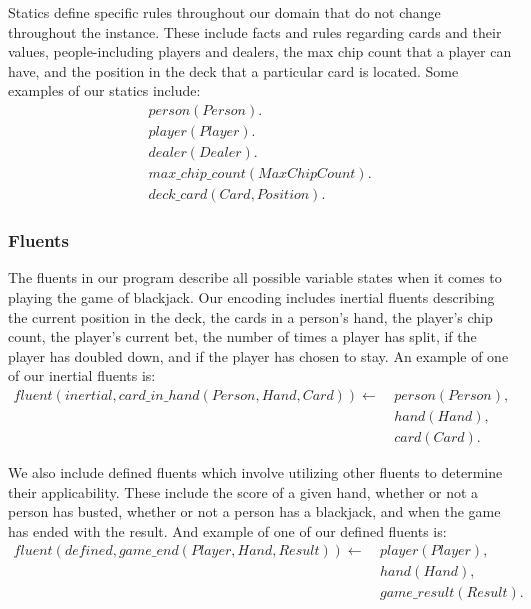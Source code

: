 \documentclass{article}
\begin{document}
Statics define specific rules throughout our domain that do not change throughout the instance.
These include facts and rules regarding cards and their values, people-including players and dealers, the max chip count
that a player can have, and the position in the deck that a particular card is located.
Some examples of our statics include:
\begin{gather}
    person(Person). \\
    player(Player). \\
    dealer(Dealer). \\
    max\_chip\_count(MaxChipCount). \\
    deck\_card(Card, Position).
\end{gather}

\subsubsection{Fluents}

The fluents in our program describe all possible variable states when it comes to playing the game of blackjack.
Our encoding includes inertial fluents describing the current position in the deck,
the cards in a person's hand, the player's chip count, the player's current bet,
the number of times a player has split, if the player has doubled down, and
if the player has chosen to stay.
An example of one of our inertial fluents is:
\begin{equation}
    \begin{split}
        fluent(inertial, card\_in\_hand(Person, Hand, Card)) \leftarrow \
            & person(Person), \\
            & hand(Hand), \\
            & card(Card).
    \end{split}
\end{equation}

We also include defined fluents which involve utilizing other fluents to determine their applicability.
These include the score of a given hand, whether or not a person has busted,
whether or not a person has a blackjack, and when the game has ended with the result.
And example of one of our defined fluents is:
\begin{equation}
    \begin{split}
        fluent(defined, game\_end(Player, Hand, Result)) \leftarrow \
            & player(Player), \\
            & hand(Hand), \\
            & game\_result(Result).
    \end{split}
\end{equation}
\end{document}
